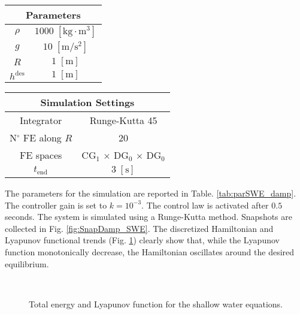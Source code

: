 \begin{table}[th]
	\centering
	\begin{tabular}{|c|c|}
		\hline 
		\multicolumn{2}{|c|}{Parameters} \\ 
		\hline 
		$\rho$ & $1000\; \mathrm{[kg \cdot m^3]}$ \\ 
		$g$& $10\; \mathrm{[m/s^2]}$ \\ 
		$R$& $1\; \mathrm{[m]}$\\ 
		$h^{\text{des}}$& $1\; \mathrm{[m]}$ \\ 
		\hline 
	\end{tabular} \hspace{1cm}
	\begin{tabular}{|c|c|}
		\hline 
		\multicolumn{2}{|c|}{Simulation Settings} \\
		\hline 
		Integrator & Runge-Kutta 45 \\
		N$^\circ$ FE along $R$ & 20 \\
		FE spaces & CG$_1$ $\times$ DG$_0$ $\times$ DG$_0$\\
		$t_{\text{end}}$ & $3\; \mathrm{[s]}$\\ 
		\hline 
	\end{tabular} 
	\captionsetup{width=0.95\linewidth}
	\vspace{1mm}
	\label{tab:parSWE_damp}
\end{table}

The parameters for the simulation are reported in Table. \eqref{tab:parSWE_damp}. The controller gain is set to $k = 10^{-3}$. The control law is activated after $0.5$ seconds. The system is simulated using a Runge-Kutta method. Snapshots are collected in Fig. \ref{fig:SnapDamp_SWE}. The discretized Hamiltonian and Lyapunov functional trends (Fig. \ref{fig:HL_SWE}) clearly show that, while the Lyapunov function monotonically decrease, the Hamiltonian oscillates around the desired equilibrium.



\begin{figure}[htb]%
	\centering
	\hspace{8pt}%
	 \\
	\caption{Total energy and Lyapunov function for the shallow water equations.}%
	\label{fig:HL_SWE}%
\end{figure}


